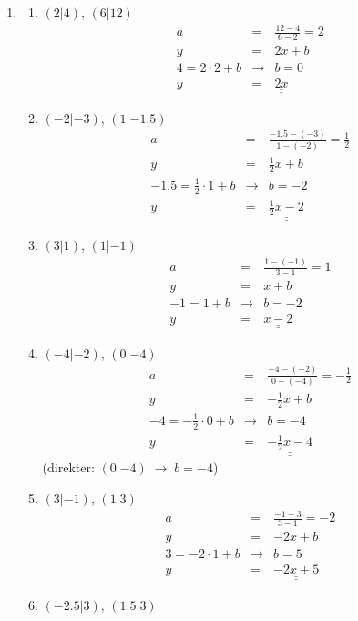 \documentclass[%
11pt,%
twoside,%
titlepage,%
german,%
headsepline%
]{scrartcl}
\newcommand{\result}[1]{\underline{\underline{#1}}}
\begin{document}
{{{\begin{enumerate}
\item
  \begin{enumerate}
  \item $(2|4)$, $(6|12)$
    \begin{eqnarray*}
      a & = & \frac{12-4}{6-2}=2 \\
      y & = & 2x + b \\
      4 = 2 \cdot 2 + b & \rightarrow & b = 0 \\
      y & = & \result{2x}
    \end{eqnarray*}
  \item $(-2|-3)$, $(1|-1.5)$
    \begin{eqnarray*}
      a & = & \frac{-1.5-(-3)}{1-(-2)}=\frac{1}{2} \\
      y & = & \frac{1}{2}x + b \\
      -1.5 = \frac{1}{2} \cdot 1 + b & \rightarrow & b = -2 \\
      y & = & \result{\frac{1}{2}x-2}
    \end{eqnarray*}
  \item $(3|1)$, $(1|-1)$
    \begin{eqnarray*}
      a & = & \frac{1-(-1)}{3-1}=1 \\
      y & = & x + b \\
      -1 = 1 + b & \rightarrow & b = -2 \\
      y & = & \result{x - 2}
    \end{eqnarray*}
  \item $(-4|-2)$, $(0|-4)$
    \begin{eqnarray*}
      a & = & \frac{-4-(-2)}{0-(-4)}=-\frac{1}{2} \\
      y & = & -\frac{1}{2}x + b \\
      -4 = -\frac{1}{2} \cdot 0 + b & \rightarrow & b = -4 \\
      y & = & \result{-\frac{1}{2}x-4}
    \end{eqnarray*}
    (direkter: $(0|-4)\;\rightarrow\;b=-4$)
  \item $(3|-1)$, $(1|3)$
    \begin{eqnarray*}
      a & = & \frac{-1-3}{3-1}=-2 \\
      y & = & -2x + b \\
      3 = -2 \cdot 1 + b & \rightarrow & b = 5 \\
      y & = & \result{-2x+5}
    \end{eqnarray*}
  \item $(-2.5|3)$, $(1.5|3)$
    \begin{eqnarray*}

\end{eqnarray*}
\end{enumerate}
\end{enumerate}}}}
\end{document}
